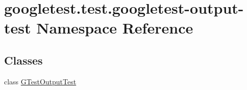 \hypertarget{namespacegoogletest_1_1test_1_1googletest-output-test}{}\section{googletest.\+test.\+googletest-\/output-\/test Namespace Reference}
\label{namespacegoogletest_1_1test_1_1googletest-output-test}
\subsection*{Classes}
\begin{DoxyCompactItemize}
\item 
class \mbox{\hyperlink{classgoogletest_1_1test_1_1googletest-output-test_1_1_g_test_output_test}{G\+Test\+Output\+Test}}
\end{DoxyCompactItemize}
